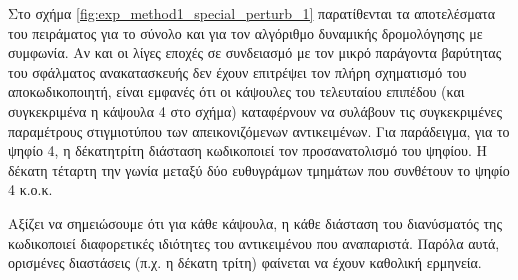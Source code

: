 Στο σχήμα \ref{fig:exp_method1_special_perturb_1} παρατίθενται τα αποτελέσματα του πειράματος για το σύνολο  και για τον αλγόριθμο δυναμικής δρομολόγησης με συμφωνία. Αν και οι λίγες εποχές σε συνδειασμό με τον μικρό παράγοντα βαρύτητας του σφάλματος ανακατασκευής δεν έχουν επιτρέψει τον πλήρη σχηματισμό του αποκωδικοποιητή, είναι εμφανές ότι οι κάψουλες του τελευταίου επιπέδου (και συγκεκριμένα η κάψουλα 4 στο σχήμα) καταφέρνουν να συλάβουν τις συγκεκριμένες παραμέτρους στιγμιοτύπου των απεικονιζόμενων αντικειμένων. Για παράδειγμα, για το ψηφίο 4, η δέκατητρίτη διάσταση κωδικοποιεί τον προσανατολισμό του ψηφίου. Η δέκατη τέταρτη την γωνία μεταξύ δύο ευθυγράμων τμημάτων που συνθέτουν το ψηφίο 4 κ.ο.κ.\par


Αξίζει να σημειώσουμε ότι για κάθε κάψουλα, η κάθε διάσταση του διανύσματός της κωδικοποιεί διαφορετικές ιδιότητες του αντικειμένου που αναπαριστά. Παρόλα αυτά, ορισμένες διαστάσεις (π.χ. η δέκατη τρίτη) φαίνεται να έχουν καθολική ερμηνεία.\par

